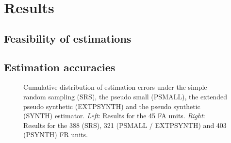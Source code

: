 \section{Results}
\label{sec:Res}

\subsection{Feasibility of estimations}
\label{sec:feasest}








%
%








\newpage
\subsection{Estimation accuracies}
\label{sec:esterr}













\begin{figure}[H]
	\centering
	\caption{Cumulative distribution of estimation errors under the simple random sampling (SRS), the pseudo small (PSMALL), the extended pseudo synthetic (EXTPSYNTH) and the pseudo synthetic (SYNTH) estimator. \textit{Left}: Results for the 45 FA units. \textit{Right}: Results for the 388 (SRS), 321 (PSMALL / EXTPSYNTH) and 403 (PSYNTH) FR units.}
	\label{fig:disterrors}
\end{figure}



